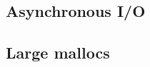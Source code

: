 \documentclass{article}
\begin{document}
\subsection{Asynchronous I/O} \label{solution:data-io-asynch}


\subsection{Large mallocs} \label{solution:memory-management}


\end{document}
